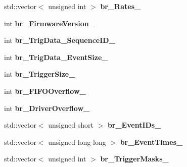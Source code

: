 \begin{DoxyCompactItemize}
\item 
\hypertarget{classannie_1_1RawReader_ae3ff1082360151c4829a05d2018e2417}{
std::vector$<$ unsigned int $>$ {\bfseries br\_\-Rates\_\-}}
\label{classannie_1_1RawReader_ae3ff1082360151c4829a05d2018e2417}

\item 
\hypertarget{classannie_1_1RawReader_a41f3d3f78fd043871f039c69876f341e}{
int {\bfseries br\_\-FirmwareVersion\_\-}}
\label{classannie_1_1RawReader_a41f3d3f78fd043871f039c69876f341e}

\item 
\hypertarget{classannie_1_1RawReader_aefc95d8ca60b7f4a8f2a119a96a08166}{
int {\bfseries br\_\-TrigData\_\-SequenceID\_\-}}
\label{classannie_1_1RawReader_aefc95d8ca60b7f4a8f2a119a96a08166}

\item 
\hypertarget{classannie_1_1RawReader_a70a0114d6e0814674244cf4baa50cccb}{
int {\bfseries br\_\-TrigData\_\-EventSize\_\-}}
\label{classannie_1_1RawReader_a70a0114d6e0814674244cf4baa50cccb}

\item 
\hypertarget{classannie_1_1RawReader_a03e5b0feb7408b42ff8981fe03c75010}{
int {\bfseries br\_\-TriggerSize\_\-}}
\label{classannie_1_1RawReader_a03e5b0feb7408b42ff8981fe03c75010}

\item 
\hypertarget{classannie_1_1RawReader_a5c4fc04ee8d56fc7f68272ed8981a1c0}{
int {\bfseries br\_\-FIFOOverflow\_\-}}
\label{classannie_1_1RawReader_a5c4fc04ee8d56fc7f68272ed8981a1c0}

\item 
\hypertarget{classannie_1_1RawReader_a7b9ef32495564301dd76b88149707893}{
int {\bfseries br\_\-DriverOverflow\_\-}}
\label{classannie_1_1RawReader_a7b9ef32495564301dd76b88149707893}

\item 
\hypertarget{classannie_1_1RawReader_a905d6738fc7c22067b95a8fdf11159a1}{
std::vector$<$ unsigned short $>$ {\bfseries br\_\-EventIDs\_\-}}
\label{classannie_1_1RawReader_a905d6738fc7c22067b95a8fdf11159a1}

\item 
\hypertarget{classannie_1_1RawReader_a88e6a3b0215bb06943f5fb533189a553}{
std::vector$<$ unsigned long long $>$ {\bfseries br\_\-EventTimes\_\-}}
\label{classannie_1_1RawReader_a88e6a3b0215bb06943f5fb533189a553}

\item 
\hypertarget{classannie_1_1RawReader_a638cbc6290cbae41386606e6e528c152}{
std::vector$<$ unsigned int $>$ {\bfseries br\_\-TriggerMasks\_\-}}
\label{classannie_1_1RawReader_a638cbc6290cbae41386606e6e528c152}


\end{DoxyCompactItemize}
